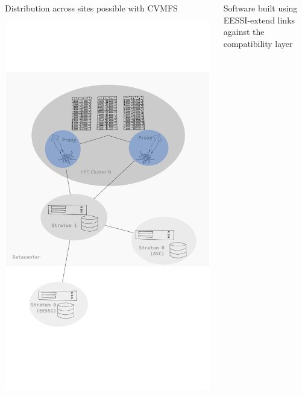 \documentclass[final]{beamer}
\begin{document}
\begin{frame}[t]
\begin{columns}[t]
\begin{column}{0.33\textwidth}
    \begin{block}{Distribution across sites possible with CVMFS}
      \begin{center}
        \includegraphics[width=280mm]{./include/main_cvmfs.pdf}
      \end{center}
    \end{block}
  \end{column}

  \begin{column}{0.63\textwidth}
      \begin{block}{Software built using EESSI-extend links against the compatibility layer}
        
      \end{block}


\end{column}
\end{columns}
\end{frame}
\end{document}

